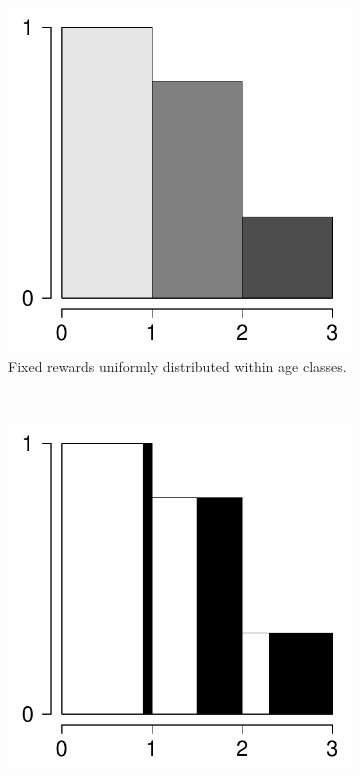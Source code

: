 \documentclass{bmcart}
\begin{document}
\begin{figure}
\centering
    \begin{subfigure}[b]{0.4\textwidth}
        \includegraphics[scale=.5]{Figures/fixedflat.pdf}
        \caption{Fixed rewards uniformly distributed within age classes.}
        \label{fig:c1}
    \end{subfigure}
    ~ 
    \begin{subfigure}[b]{0.4\textwidth}
        \includegraphics[scale=.5]{Figures/fixedbars.pdf}

\end{subfigure}
\end{figure}
\end{document}
